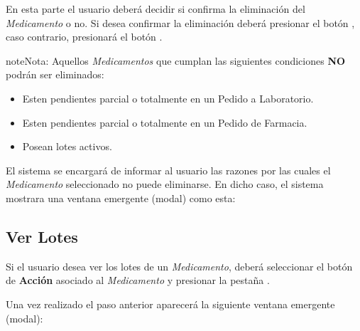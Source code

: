 \documentclass[a4paper,10pt,spanish]{sphinxmanual}
\begin{document}

En esta parte el usuario deberá decidir si confirma la eliminación del \emph{Medicamento} o no. Si desea confirmar la eliminación deberá presionar el botón , caso contrario, presionará el botón .

\begin{notice}{note}{Nota:}
Aquellos \emph{Medicamentos} que cumplan las siguientes condiciones \textbf{NO} podrán ser eliminados:
\begin{itemize}
\item {} 
Esten pendientes parcial o totalmente en un Pedido a Laboratorio.

\item {} 
Esten pendientes parcial o totalmente en un Pedido de Farmacia.

\item {} 
Posean lotes activos.

\end{itemize}

El sistema se encargará de informar al usuario las razones por las cuales el \emph{Medicamento} seleccionado no puede eliminarse. En dicho caso, el sistema mostrara una ventana emergente (modal) como esta:

\end{notice}


\subsection{Ver Lotes}
\label{medicams:id4}\label{medicams:ver-lotes}
Si el usuario desea ver los lotes de un \emph{Medicamento}, deberá seleccionar el botón de \textbf{Acción} asociado al \emph{Medicamento} y presionar la pestaña .


Una vez realizado el paso anterior aparecerá la siguiente ventana emergente (modal):

\end{document}
